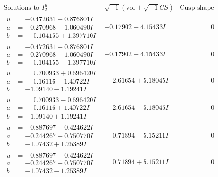 \documentclass[1p]{elsarticle_modified}
\theoremstyle{definition}
\newcommand{\I}{\sqrt{-1}}
\begin{document}
$$\begin{array}{c|c|c}  
\text{Solutions to }I^u_{2}& \I (\text{vol} + \sqrt{-1}CS) & \text{Cusp shape}\\
 \hline 
\begin{aligned}
u &= -0.472631 + 0.876801 I \\
a &= -0.270968 + 1.060490 I \\
b &= \phantom{-}0.104155 + 1.397710 I\end{aligned}
 & -0.17902 - 4.15433 I & \phantom{-0.000000 } 0 \\ \hline\begin{aligned}
u &= -0.472631 - 0.876801 I \\
a &= -0.270968 - 1.060490 I \\
b &= \phantom{-}0.104155 - 1.397710 I\end{aligned}
 & -0.17902 + 4.15433 I & \phantom{-0.000000 } 0 \\ \hline\begin{aligned}
u &= \phantom{-}0.700933 + 0.696420 I \\
a &= \phantom{-}0.16116 - 1.40722 I \\
b &= -1.09140 - 1.19241 I\end{aligned}
 & \phantom{-}2.61654 + 5.18045 I & \phantom{-0.000000 } 0 \\ \hline\begin{aligned}
u &= \phantom{-}0.700933 - 0.696420 I \\
a &= \phantom{-}0.16116 + 1.40722 I \\
b &= -1.09140 + 1.19241 I\end{aligned}
 & \phantom{-}2.61654 - 5.18045 I & \phantom{-0.000000 } 0 \\ \hline\begin{aligned}
u &= -0.887697 + 0.424622 I \\
a &= -0.244267 + 0.750770 I \\
b &= -1.07432 + 1.25389 I\end{aligned}
 & \phantom{-}0.71894 - 5.15211 I & \phantom{-0.000000 } 0 \\ \hline\begin{aligned}
u &= -0.887697 - 0.424622 I \\
a &= -0.244267 - 0.750770 I \\
b &= -1.07432 - 1.25389 I\end{aligned}
 & \phantom{-}0.71894 + 5.15211 I & \phantom{-0.000000 } 0 \\ \hline\begin{aligned}

\end{aligned}
\end{array}$$
\end{document}
